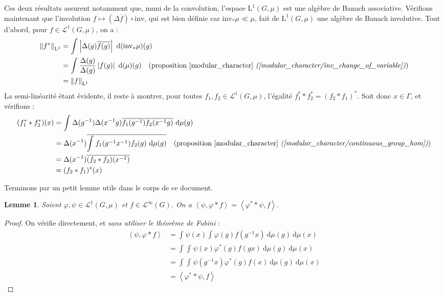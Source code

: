 \documentclass[a4paper,12pt]{article}
\newtheorem{lemma}[theorem]{Lemme}
\newcommand{\norm}[1]{\left\Vert #1\right\Vert}
\newcommand{\abs}[1]{\left\vert#1\right\vert}
\newcommand{\ket}[1]{\left\langle #1 \right\rangle}
\newcommand{\integral}[4]{\int_{#1}^{#2} #3~\mathrm{d}#4}
\newcommand{\inv}{^{-1}}
\newcommand{\comp}{\circ}
\newcommand{\invop}{\mathrm{inv}}
\begin{document}
Ces deux résultats assurent notamment que, muni de la convolution, l'espace $\mathrm{L}^1(G, \mu)$
est une algèbre de Banach associative. Vérifions maintenant que l'involution $f\mapsto(\Delta\overline{f})\comp\invop$, qui est bien définie car 
$\invop_*\mu\ll\mu$, fait de $\mathrm{L}^1(G, \mu)$ une algèbre de Banach involutive. Tout d'abord, pour $f\in\mathscr{L}^1(G, \mu)$, on a : 
\begin{align*}
    \norm{f^*}_{\mathrm{L}^1} 
        &= \integral{}{}{\abs{\Delta(g)\overline{f(g)}}}{(\invop_*\mu)(g)} \\
        &= \integral{}{}{\frac{\Delta(g)}{\Delta(g)}\abs{f(g)}}{(\mu)(g)} \quad\text{(proposition \ref{modular_character} \textit{(\ref{modular_character/inv_change_of_variable})})}\\
        &= \norm{f}_{\mathrm{L}^1}
\end{align*}
La semi-linéarité étant évidente, il reste à montrer, pour toutes $f_1, f_2\in\mathscr{L}^1(G, \mu)$, l'égalité $f_1^*\ast f_2^* = (f_2\ast f_1)^*$. Soit donc $x\in\Gamma$, et vérifions :
\begin{align*}
    (f_1^*\ast f_2^*)(x) 
        &= \integral{}{}{\Delta(g\inv)\Delta(x\inv g)\overline{f_1(g\inv) f_2(x\inv g)}}{\mu(g)} \\
        &= \Delta(x\inv)\overline{\integral{}{}{f_1(g\inv x\inv) f_2(g)}{\mu(g)}} \quad\text{(proposition \ref{modular_character} \textit{(\ref{modular_character/continuous_group_hom})})}\\
        &= \Delta(x\inv)\overline{(f_2\ast f_2)(x\inv)} \\
        &= (f_2\ast f_1)^*(x)
\end{align*}

Terminons par un petit lemme utile dans le corps de ce document. 

\begin{lemma}\label{ket_conv}
    Soient $\varphi, \psi\in\mathscr{L}^1(G, \mu)$ et $f\in\mathscr{L}^\infty(G)$. 
    On a $\ket{\psi, \varphi\ast f} = \ket{\varphi^*\ast\psi, f}$.
\end{lemma}

\begin{proof}
    On vérifie directement, et \emph{sans utiliser le théorème de Fubini} :
    \begin{align*}
        \ket{\psi, \varphi\ast f} 
            &= \integral{}{}{\psi(x)\integral{}{}{\varphi(g)f(g\inv x)}{\mu(g)}}{\mu(x)} \\
            &= \integral{}{}{\integral{}{}{\psi(x)\varphi^*(g)f(g x)}{\mu(g)}}{\mu(x)} \\
            &= \integral{}{}{\integral{}{}{\psi(g\inv x)\varphi^*(g)f(x)}{\mu(g)}}{\mu(x)} \\
            &= \ket{\varphi^*\ast\psi, f} 
    \end{align*}
\end{proof}
\end{document}
